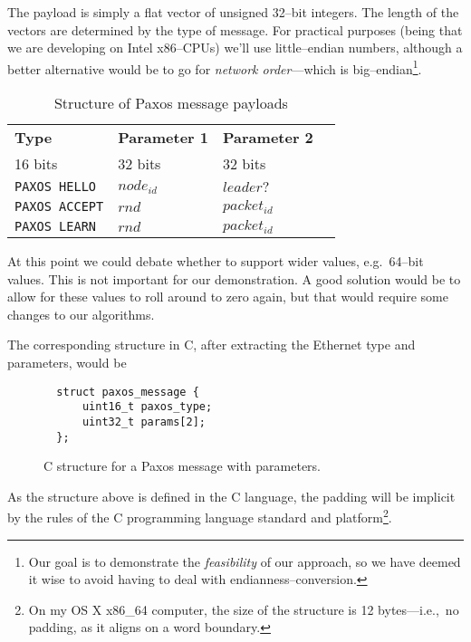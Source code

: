 The payload is simply a flat vector of unsigned 32--bit integers.  The length
of the vectors are determined by the type of message.  For practical
purposes (being that we are developing on Intel x86--CPUs) we'll use
little--endian numbers, although a better alternative would be to go for
\textit{network order}---which is big--endian\footnote{Our goal is to
demonstrate the \textit{feasibility} of our approach, so we have deemed it
wise to avoid having to deal with endianness--conversion.}.

\begin{table}[H]
  \centering
  \begin{tabular}{|l|l|l|l|}
    \hline \textbf{Type} & \textbf{Parameter 1} & \textbf{Parameter 2} \\
           16 bits & 32 bits & 32 bits \\
    \hline \texttt{PAXOS HELLO} & $node_{id}$ & $leader?$ \\
    \hline \texttt{PAXOS ACCEPT} & $rnd$ & $packet_{id}$ \\
    \hline \texttt{PAXOS LEARN} & $rnd$ & $packet_{id}$ \\
    \hline
  \end{tabular}
  \label{table:paxos.payload.structure}
  \caption{Structure of Paxos message payloads}
\end{table}

At this point we
could debate whether to support wider values, e.g.~64--bit values.
This is not important for our demonstration.  A good solution would be to
allow for these values to roll around to zero again, but that would require
some changes to our algorithms.

The corresponding structure in C, after extracting the Ethernet type and
parameters, would be

\begin{figure}[H]
  \begin{Verbatim}
  struct paxos_message {
      uint16_t paxos_type;
      uint32_t params[2];
  };
  \end{Verbatim}
  \label{struct:paxos.message}
  \caption{C structure for a Paxos message with parameters.}
\end{figure}

As the structure above is defined in the C language, the padding will be
implicit by the rules of the C programming language standard and
platform\footnote{On my OS X x86\_{}64 computer, the size of the structure
is 12 bytes---i.e.,~no padding, as it aligns on a word boundary.}.

